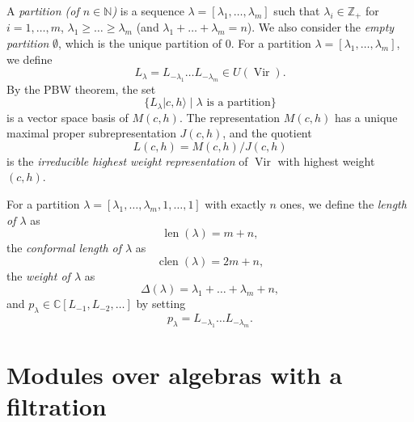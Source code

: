 \documentclass[a4paper, 12pt, reqno]{amsart}
\theoremstyle{remark}
\DeclareMathOperator{\Vir}{Vir}
\DeclareMathOperator{\len}{len}
\DeclareMathOperator{\clen}{clen}
\begin{document}
A \emph{partition (of $n \in \mathbb{N}$)} is a sequence $\lambda = [\lambda_1, \dots, \lambda_m]$ such that $\lambda_i \in \mathbb{Z}_+$ for $i = 1, \dots, m$, $\lambda_1 \ge \dots \ge \lambda_m$ (and $\lambda_1 + \dots + \lambda_m = n$).
We also consider the \emph{empty partition} $\emptyset$, which is the unique partition of $0$.
For a partition $\lambda = [\lambda_1, \dots, \lambda_m]$, we define
\begin{equation*}
  L_{\lambda} = L_{-\lambda_1}\dots L_{-\lambda_m} \in U(\Vir).
\end{equation*}
By the PBW theorem, the set
\begin{equation*}
  \{L_{\lambda}|c, h\rangle \mid \text{$\lambda$ is a partition}\}
\end{equation*}
is a vector space basis of $M(c, h)$.
The representation $M(c, h)$ has a unique maximal proper subrepresentation $J(c, h)$, and the quotient
\begin{equation*}
  L(c, h) = M(c, h)/J(c, h)
\end{equation*}
is the \emph{irreducible highest weight representation} of $\Vir$ with highest weight $(c, h)$.

For a partition $\lambda = [\lambda_1, \dots, \lambda_m, 1, \dots, 1]$ with exactly $n$ ones, we define the \emph{length of $\lambda$} as
\begin{equation*}
  \len(\lambda) = m + n,
\end{equation*}
the \emph{conformal length of $\lambda$} as
\begin{equation*}
  \clen(\lambda) = 2m + n,
\end{equation*}
the \emph{weight of $\lambda$} as
\begin{equation*}
  \Delta(\lambda) = \lambda_1 + \dots + \lambda_m + n,
\end{equation*}
and $p_{\lambda} \in \mathbb{C}[L_{-1}, L_{-2}, \dots]$ by setting
\begin{equation*}
  p_{\lambda} = L_{-\lambda_1}\dots L_{-\lambda_m}.
\end{equation*}

\section{Modules over algebras with a filtration}
\label{sec:modul-over-algebr}
\end{document}

